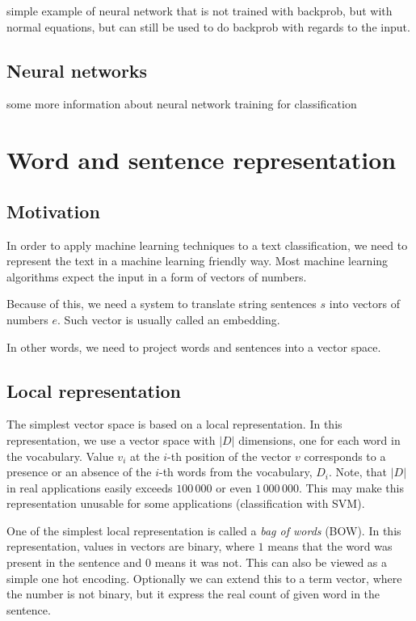         simple example of neural network that is not trained with backprob, but with normal equations,  
        but can still be used to do backprob with regards to the input.
    
    \subsection{Neural networks}
    
        some more information about neural network training for classification

    
\section{Word and sentence representation}

    \subsection{Motivation}
    
    In order to apply machine learning techniques to a text classification, 
    we need to represent the text in a machine learning friendly way.
    Most machine learning algorithms expect the input in a form of vectors of numbers. 
    
    Because of this, we need a system to translate string sentences $s$ into vectors of numbers $e$.
    Such vector is usually called an embedding. 
    
    In  other words, we need to project words and sentences into a vector space.
    
    
    \subsection{Local representation}
    
    The simplest vector space is based on a local representation.
    In this representation, we use a vector space with $|D|$ dimensions, one for each word in the vocabulary.
    Value $v_i$ at the $i$-th position of the vector $v$ corresponds to a presence or an absence of the $i$-th words from the vocabulary, $D_i$.
    Note, that $|D|$ in real applications easily exceeds $100\,000$ or even $1\,000\,000$.
    This may make this representation unusable for some applications (classification with SVM).
    
    One of the simplest local representation is called a \textit{bag of words} (BOW). 
    In this representation, values in vectors are binary, where $1$ means that the word was present in the sentence and $0$ means it was not.
    This can also be viewed as a simple one hot encoding.
    Optionally we can extend this to a term vector, where the number is not binary, but it express the real count of given word in the sentence.
    
